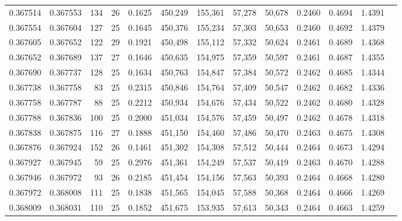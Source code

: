 \begin{tabular}{rrrrrrrrrrrrr}
0.367514 & 0.367553 &   134 &  26 &                                     0.1625 & 450,249 & 155,361 &  57,278 &  50,678 & 0.2460 & 0.4694 & 1.4391 \\
0.367554 & 0.367604 &   127 &  25 &                                     0.1645 & 450,376 & 155,234 &  57,303 &  50,653 & 0.2460 & 0.4692 & 1.4379 \\
0.367605 & 0.367652 &   122 &  29 &                                     0.1921 & 450,498 & 155,112 &  57,332 &  50,624 & 0.2461 & 0.4689 & 1.4368 \\
0.367652 & 0.367689 &   137 &  27 &                                     0.1646 & 450,635 & 154,975 &  57,359 &  50,597 & 0.2461 & 0.4687 & 1.4355 \\
0.367690 & 0.367737 &   128 &  25 &                                     0.1634 & 450,763 & 154,847 &  57,384 &  50,572 & 0.2462 & 0.4685 & 1.4344 \\
0.367738 & 0.367758 &    83 &  25 &                                     0.2315 & 450,846 & 154,764 &  57,409 &  50,547 & 0.2462 & 0.4682 & 1.4336 \\
0.367758 & 0.367787 &    88 &  25 &                                     0.2212 & 450,934 & 154,676 &  57,434 &  50,522 & 0.2462 & 0.4680 & 1.4328 \\
0.367788 & 0.367836 &   100 &  25 &                                     0.2000 & 451,034 & 154,576 &  57,459 &  50,497 & 0.2462 & 0.4678 & 1.4318 \\
0.367838 & 0.367875 &   116 &  27 &                                     0.1888 & 451,150 & 154,460 &  57,486 &  50,470 & 0.2463 & 0.4675 & 1.4308 \\
0.367876 & 0.367924 &   152 &  26 &                                     0.1461 & 451,302 & 154,308 &  57,512 &  50,444 & 0.2464 & 0.4673 & 1.4294 \\
0.367927 & 0.367945 &    59 &  25 &                                     0.2976 & 451,361 & 154,249 &  57,537 &  50,419 & 0.2463 & 0.4670 & 1.4288 \\
0.367946 & 0.367972 &    93 &  26 &                                     0.2185 & 451,454 & 154,156 &  57,563 &  50,393 & 0.2464 & 0.4668 & 1.4280 \\
0.367972 & 0.368008 &   111 &  25 &                                     0.1838 & 451,565 & 154,045 &  57,588 &  50,368 & 0.2464 & 0.4666 & 1.4269 \\
0.368009 & 0.368031 &   110 &  25 &                                     0.1852 & 451,675 & 153,935 &  57,613 &  50,343 & 0.2464 & 0.4663 & 1.4259 \\

\end{tabular}
